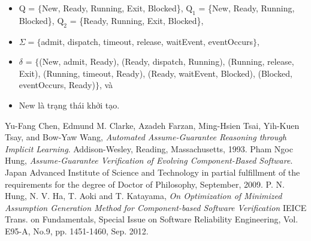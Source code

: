 \documentclass[a4paper,13pt,oneside,openany]{book}
\begin{document}
\begin{flushleft}
\begin{itemize}
		\item Q = $\{$New, Ready, Running, Exit, Blocked\}, $\textrm{Q}_1$ = \{New, Ready, Running, Blocked\}, $\textrm{Q}_2$ = \{Ready, Running, Exit, Blocked\},
		\item $\Sigma = \{$admit, dispatch, timeout, release, waitEvent, eventOccurs$\}$,
		\item $\delta$ = $\{$(New, admit, Ready), (Ready, dispatch, Running), (Running, release, Exit), (Running, timeout, Ready), (Ready, waitEvent, Blocked), (Blocked, eventOccurs, Ready)$\}$, và
		\item New là trạng thái khởi tạo.
	\end{itemize}
	\end{flushleft}
\begin{thebibliography}{9}
	Yu-Fang Chen, Edmund M. Clarke, Azadeh Farzan, Ming-Hsien Tsai,
	Yih-Kuen Tsay, and Bow-Yaw Wang, \textit{Automated Assume-Guarantee Reasoning
		through Implicit Learning}. 
	Addison-Wesley, Reading, Massachusetts, 1993.
	Pham Ngoc Hung, \textit{Assume-Guarantee Verification of Evolving Component-Based Software}.
	Japan Advanced Institute of Science and Technology in partial fulfillment of the requirements for the degree of Doctor of Philosophy, September, 2009.
	P. N. Hung, N. V.  Ha, T. Aoki and T. Katayama, \textit{On Optimization of Minimized Assumption Generation Method for Component-based Software Verification}
	IEICE Trans. on Fundamentals, Special Issue on Software Reliability Engineering, Vol. E95-A, No.9, pp. 1451-1460, Sep. 2012.
\end{thebibliography}
\end{document}
